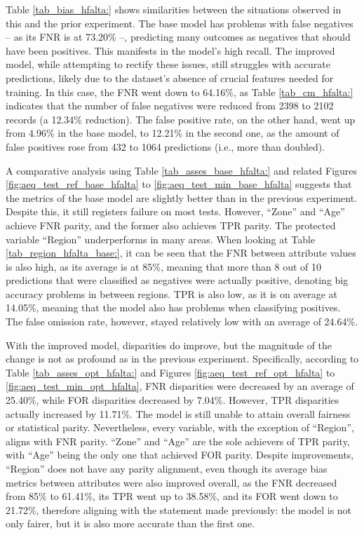 \documentclass[twoside,11pt]{article}
\begin{document}
Table \ref{tab_bias_hfalta:} shows similarities between the situations observed in this and the prior experiment. The base model has problems with false negatives -- as its FNR is at 73.20\% --, predicting many outcomes as negatives that should have been positives. This manifests in the model's high recall. The improved model, while attempting to rectify these issues, still struggles with accurate predictions, likely due to the dataset's absence of crucial features needed for training. In this case, the FNR went down to 64.16\%, as Table \ref{tab_cm_hfalta:} indicates that the number of false negatives were reduced from 2398 to 2102 records (a 12.34\% reduction). The false positive rate, on the other hand, went up from 4.96\% in the base model, to 12.21\% in the second one, as the amount of false positives rose from 432 to 1064 predictions (i.e., more than doubled). 

A comparative analysis using Table \ref{tab_asses_base_hfalta:} and related Figures \ref{fig:aeq_test_ref_base_hfalta} to \ref{fig:aeq_test_min_base_hfalta} suggests that the metrics of the base model are slightly better than in the previous experiment. Despite this, it still registers failure on most tests. However, ``Zone'' and ``Age'' achieve FNR parity, and the former also achieves TPR parity. The protected variable ``Region'' underperforms in many areas. When looking at Table \ref{tab_region_hfalta_base:}, it can be seen that the FNR between attribute values is also high, as its average is at 85\%, meaning that more than 8 out of 10 predictions that were classified as negatives were actually positive, denoting big accuracy problems in between regions. TPR is also low, as it is on average at 14.05\%, meaning that the model also has problems when classifying positives. The false omission rate, however, stayed relatively low with an average of 24.64\%.

With the improved model, disparities do improve, but the magnitude of the change is not as profound as in the previous experiment. Specifically, according to Table \ref{tab_asses_opt_hfalta:} and Figures \ref{fig:aeq_test_ref_opt_hfalta} to \ref{fig:aeq_test_min_opt_hfalta}, FNR disparities were decreased by an average of 25.40\%, while FOR disparities decreased by 7.04\%. However, TPR disparities actually increased by 11.71\%. The model is still unable to attain overall fairness or statistical parity. Nevertheless, every variable, with the exception of ``Region'', aligns with FNR parity. ``Zone'' and ``Age'' are the sole achievers of TPR parity, with ``Age'' being the only one that achieved FOR parity. Despite improvements, ``Region'' does not have any parity alignment, even though its average bias metrics between attributes were also improved overall, as the FNR decreased from 85\% to 61.41\%, its TPR went up to 38.58\%, and its FOR went down to 21.72\%, therefore aligning with the statement made previously: the model is not only fairer, but it is also more accurate than the first one.
\end{document}

